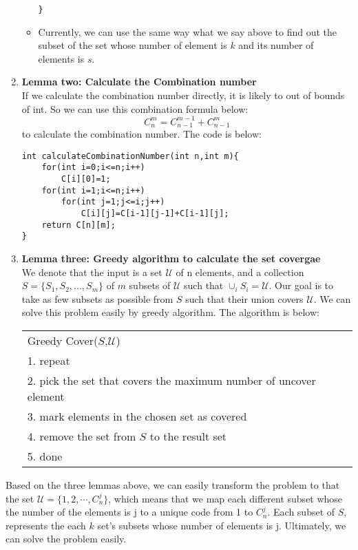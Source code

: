 \begin{enumerate}
\begin{itemize}
\begin{lstlisting}
}
\end{lstlisting}
        \end{itemize}
        \begin{itemize}
            \item Currently, we can use the same way what we say above to find out the subset of the set whose number of element is 
            $k$ and its number of elements is $s$.
        \end{itemize}
    \item \textbf{Lemma two: Calculate the Combination number}\\
    If we calculate the combination number directly, it is likely to out of bounds of int. So we can use this combination formula below:
    $$C_n^m=C_{n-1}^{m-1}+C_{n-1}^m$$
    to calculate the combination number. The code is below:
\begin{lstlisting}
int calculateCombinationNumber(int n,int m){
    for(int i=0;i<=n;i++)
        C[i][0]=1;
    for(int i=1;i<=n;i++)
        for(int j=1;j<=i;j++)
            C[i][j]=C[i-1][j-1]+C[i-1][j];
    return C[n][m];
}
\end{lstlisting}
    \item \textbf{Lemma three: Greedy algorithm to calculate the set covergae}\\
    We denote that the input is a set $\mathcal{U}$ of n elements, and a collection $S=\{S_1, S_2, . . . , S_m\}$ of $m$ subsets of $\mathcal{U}$ such that
    $\cup_iS_i=\mathcal{U}$. Our goal is to take as few subsets as possible from $S$ such that their union covers $\mathcal{U}$.
    We can solve this problem easily by greedy algorithm. The algorithm is below:
    \begin{table}[H]
        \centering
        \begin{tabular}{|l|}
        \hline
        Greedy Cover($S$,$\mathcal{U}$)                                                     \\
        1. repeat                                                             \\
        2.     pick the set that covers the maximum number of uncover element \\
        3.     mark elements in the chosen set as covered                     \\
        4.     remove the set from $S$ to the result set                        \\
        5. done                                                               \\ \hline
        \end{tabular}
        \end{table}
    \end{enumerate}
    Based on the three lemmas above, we can easily transform the problem to that the set $\mathcal{U}=\{1,2,\cdots, C^j_n\}$, which means that we map each different subset 
    whose the number of the elements is j to a unique code from 1 to $ C^j_n$. Each subset of $S$, represents the each $k$ set's subsets whose number of elements is j. Ultimately, 
    we can solve the problem easily.
